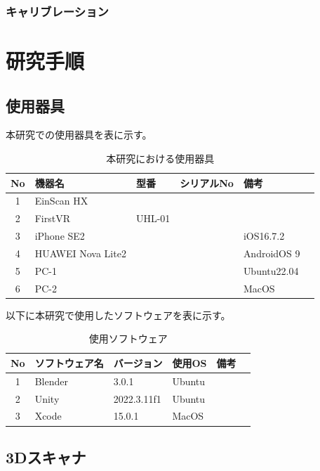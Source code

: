 \documentclass{ltjsreport}
\begin{document}
		\subsection{キャリブレーション}
	
\chapter{研究手順}
	\section{使用器具}
		本研究での使用器具を表に示す。
	\begin{table}[H]
	\begin{center}
	\caption{本研究における使用器具}
	\label{tab:usedev}
	\begin{tabular}{clllll} \toprule
	No&\multicolumn{1}{l}{機器名}&\multicolumn{1}{l}{型番}&\multicolumn{1}{l}{シリアルNo}&\multicolumn{1}{l}{備考}\\ \hline
	1&EinScan HX&&&\\
	2&FirstVR&UHL-01&&\\
	3&iPhone SE2&&&iOS16.7.2\\
	4&HUAWEI Nova Lite2&&&AndroidOS 9\\
	5&PC-1&&&Ubuntu22.04\\
	6&PC-2&&&MacOS\\
	\bottomrule
	\end{tabular}
	\end{center}
	\end{table}
	以下に本研究で使用したソフトウェアを表に示す。
	\begin{table}[H]
	\begin{center}
	\caption{使用ソフトウェア}
	\label{tab:usesoft}
	\begin{tabular}{clllll} \toprule
	No&\multicolumn{1}{l}{ソフトウェア名}&\multicolumn{1}{l}{バージョン}&\multicolumn{1}{l}{使用OS}&\multicolumn{1}{l}{備考}\\ \hline
	1&Blender&3.0.1&Ubuntu&\\
	2&Unity&2022.3.11f1&Ubuntu&\\
	3&Xcode&15.0.1&MacOS&\\
	\bottomrule
	\end{tabular}
	\end{center}
	\end{table}
	\section{3Dスキャナ}
\end{document}

